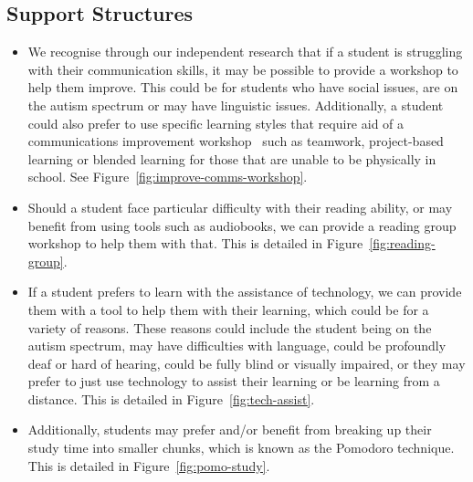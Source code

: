 \subsection{Support Structures}
\begin{itemize}
    \item We recognise through our independent research that if a student is struggling with their communication skills, it may be possible to provide a workshop to help them improve. This could be for students who have social issues, are on the autism spectrum or may have linguistic issues. Additionally, a student could also prefer to use specific learning styles that require aid of a communications improvement workshop \textemdash~such as teamwork, project-based learning or blended learning for those that are unable to be physically in school. See Figure~\ref{fig:improve-comms-workshop}.
    \item Should a student face particular difficulty with their reading ability, or may benefit from using tools such as audiobooks, we can provide a reading group workshop to help them with that. This is detailed in Figure~\ref{fig:reading-group}.
    \item If a student prefers to learn with the assistance of technology, we can provide them with a tool to help them with their learning, which could be for a variety of reasons. These reasons could include the student being on the autism spectrum, may have difficulties with language, could be profoundly deaf or hard of hearing, could be fully blind or visually impaired, or they may prefer to just use technology to assist their learning or be learning from a distance. This is detailed in Figure~\ref{fig:tech-assist}.
    \item Additionally, students may prefer and/or benefit from breaking up their study time into smaller chunks, which is known as the Pomodoro technique. This is detailed in Figure~\ref{fig:pomo-study}.
\end{itemize}